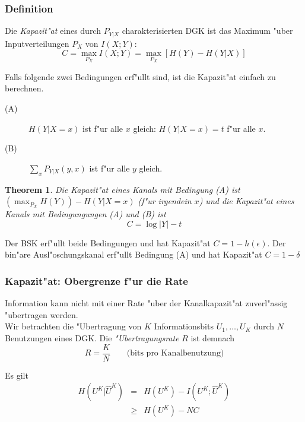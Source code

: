 \documentclass[german, 10pt, a4paper, twocolumn]{scrartcl}
\newtheorem{theorem}{Theorem}
\begin{document}
\subsubsection{Definition}

Die \textit{Kapazit"at} eines durch $P_{Y|X}$ charakterisierten DGK ist das Maximum "uber Inputverteilungen $P_X$ von $I(X;Y)$:
\begin{displaymath}
	C = \max_{P_X} I(X;Y) = \max_{P_X}[H(Y)- H(Y|X)]
\end{displaymath}

Falls folgende zwei Bedingungen erf"ullt sind, ist die Kapazit"at einfach zu berechnen.
\begin{description}
	\item [(A)] $H(Y|X=x)$ ist f"ur alle $x$ gleich: $H(Y|X=x)=t$ f"ur alle $x$.
	\item [(B)] $\sum_x P_{Y|X}(y,x)$ ist f"ur alle $y$ gleich.
\end{description}

\begin{theorem}
	Die Kapazit"at eines Kanals mit Bedingung (A) ist $(\max_{P_X}H(Y))- H(Y|X=x)$ (f"ur irgendein $x$) und die Kapazit"at eines Kanals mit Bedingungungen (A) und (B) ist
	\begin{displaymath}
		C = \log |Y| -t
	\end{displaymath}
\end{theorem}

Der BSK erf"ullt beide Bedingungen und hat Kapazit"at $C= 1- h(\epsilon)$. Der bin"are Ausl"oschungskanal erf"ullt Bedingung (A) und hat Kapazit"at $C=1-\delta$

\subsubsection{Kapazit"at: Obergrenze f"ur die Rate}

Information kann nicht mit einer Rate "uber der Kanalkapazit"at zuverl"assig "ubertragen werden.\\

Wir betrachten die "Ubertragung von $K$ Informationsbits $U_1,\ldots,U_K$ durch $N$ Benutzungen eines DGK. Die \textit{"Ubertragungsrate} $R$ ist demnach
\begin{displaymath}
	R = \frac{K}{N} \qquad \mbox{(bits pro Kanalbenutzung)}
\end{displaymath}

Es gilt
\begin{eqnarray}
	H(U^K|\hat{U}^K) &	= &	H(U^K) - I(U^K; \hat{U}^K) \nonumber \\
	&			\geq &	H(U^K)- NC \nonumber
\end{eqnarray}
\end{document}
